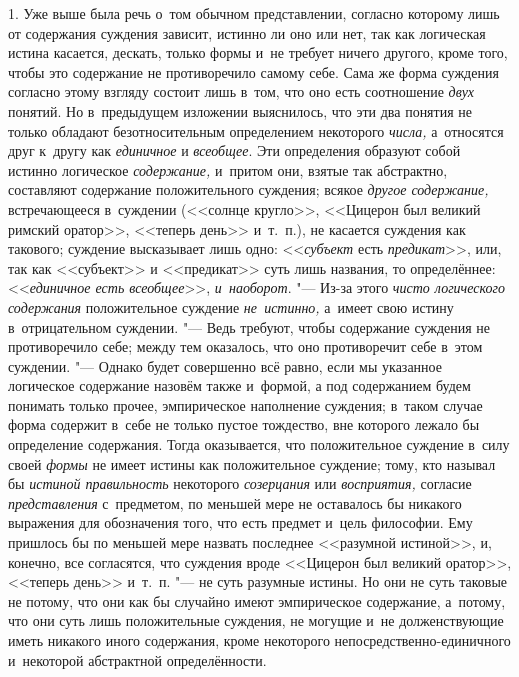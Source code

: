 
1. Уже выше была речь о~том обычном представлении, согласно
которому лишь от содержания суждения зависит, истинно ли оно или нет, так
как логическая истина касается, дескать, только формы и~не требует ничего
другого, кроме того, чтобы это содержание не противоречило самому себе.
Сама же форма суждения согласно этому взгляду состоит лишь в~том, что оно
есть соотношение {\em двух} понятий. Но в~предыдущем изложении выяснилось, что
эти два понятия не только обладают безотносительным определением некоторого
{\em числа,} а~относятся друг к~другу как {\em единичное} и {\em всеобщее}.
Эти определения образуют собой истинно логическое {\em содержание,} и~притом
они, взятые так абстрактно, составляют содержание положительного суждения;
всякое {\em другое содержание,} встречающееся в~суждении (<<солнце кругло>>,
<<Цицерон был великий римский оратор>>, <<теперь день>> и~т.~п.), не касается
суждения как такового; суждение высказывает лишь одно: <<{\em субъект} есть
{\em предикат}>>, или, так как <<субъект>> и <<предикат>> суть лишь названия,
то определённее: <<{\em единичное есть всеобщее}>>, {\em и~наоборот}. "---
Из-за этого {\em чисто логического содержания} положительное суждение
{\em не~истинно,} а~имеет свою истину в~отрицательном суждении. "--- Ведь
требуют, чтобы содержание суждения не противоречило себе; между тем оказалось,
что оно противоречит себе в~этом суждении. "--- Однако будет совершенно
всё равно, если мы указанное логическое содержание назовём также и~формой,
а под содержанием будем понимать только прочее, эмпирическое наполнение
суждения; в~таком случае форма содержит в~себе не только пустое тождество,
вне которого лежало бы определение содержания. Тогда оказывается, что
положительное суждение в~силу своей {\em формы} не имеет
истины как положительное суждение; тому, кто называл бы
{\em истиной правильность} некоторого {\em созерцания} или
{\em восприятия,} согласие {\em представления} с~предметом,
по меньшей мере не оставалось бы никакого выражения для
обозначения того, что есть предмет и~цель философии. Ему пришлось бы по
меньшей мере назвать последнее <<разумной истиной>>, и, конечно, все
согласятся, что суждения вроде <<Цицерон был великий оратор>>, <<теперь день>>
и~т.~п. "--- не суть разумные истины. Но они не суть таковые не
потому, что они как бы случайно имеют эмпирическое содержание, а~потому,
что они суть лишь положительные суждения, не могущие и~не долженствующие
иметь никакого иного содержания, кроме некоторого
непосредственно-единичного и~некоторой абстрактной определённости.

